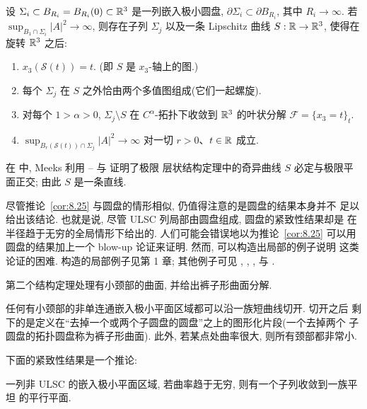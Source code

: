 \begin{theorem}
\label{thm:8.26}
设 $\Sigma_i\subset B_{R_i}=B_{R_i}(0)\subset\mathbb{R}^3$ 是一列嵌入极小圆盘,
$\partial\Sigma_i\subset\partial B_{R_i}$, 其中 $R_i\to\infty$. 若
$\sup_{B_1\cap\Sigma_i}|A|^2\to\infty$, 则存在子列 $\Sigma_j$ 以及一条
Lipschitz 曲线 $S:\mathbb{R}\to\mathbb{R}^3$, 使得在旋转 $\mathbb{R}^3$ 之后:

\begin{enumerate}
\item $x_3(\mathcal{S}(t))=t$. (即 $S$ 是 $x_3$-轴上的图.)
\item 每个 $\Sigma_j$ 在 $S$ 之外恰由两个多值图组成(它们一起螺旋).
\item 对每个 $1>\alpha>0$, $\Sigma_j\setminus S$ 在 $C^\alpha$-拓扑下收敛到
$\mathbb{R}^3$ 的叶状分解 $\mathcal{F}=\{x_3=t\}_t$.
\item $\sup_{B_r(\mathcal{S}(t))\cap\Sigma_j}|A|^2\to\infty$ 对一切 $r>0$、$t\in\mathbb{R}$ 成立.
\end{enumerate}
\end{theorem}

在 \cite{Me2} 中, Meeks 利用 \cite{CM3}--\cite{CM6} 与 \cite{MeR2} 证明了极限
层状结构定理中的奇异曲线 $S$ 必定与极限平面正交; 由此 $S$ 是一条直线.

尽管推论~\ref{cor:8.25} 与圆盘的情形相似, 仍值得注意的是圆盘的结果本身并不
足以给出该结论. 也就是说, 尽管 ULSC 列局部由圆盘组成, 圆盘的紧致性结果却是
在半径趋于无穷的全局情形下给出的. 人们可能会错误地以为推论~\ref{cor:8.25}
可以用圆盘的结果加上一个 blow-up 论证来证明. 然而, 可以构造出局部的例子说明
这类论证的困难. \cite{CM18} 构造的局部例子见第 1 章; 其他例子可见
\cite{CaL}, \cite{HoWh2}, \cite{Kh}, \cite{Kl} 与 \cite{MeWe}.


第二个结构定理处理有小颈部的曲面, 并给出裤子形曲面分解.

\begin{theorem}
\label{thm:8.27}
任何有小颈部的非单连通嵌入极小平面区域都可以沿一族短曲线切开. 切开之后
剩下的是定义在``去掉一个或两个子圆盘的圆盘''之上的图形化片段(一个去掉两个
子圆盘的拓扑圆盘称为裤子形曲面). 此外, 若某点处曲率很大, 则所有颈部都非常小.
\end{theorem}

下面的紧致性结果是一个推论:

\begin{corollary}
\label{cor:8.28}
一列非 ULSC 的嵌入极小平面区域, 若曲率趋于无穷, 则有一个子列收敛到一族平坦
的平行平面.
\end{corollary}

